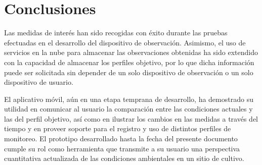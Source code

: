 \documentclass[../main]{subfiles}
\begin{document}
\section{Conclusiones}

Las medidas de interés han sido recogidas con éxito durante las pruebas
efectuadas en el desarrollo del dispositivo de observación.
Asimismo, el uso de servicios en la nube para almacenar las observaciones
obtenidas ha sido extendido con la capacidad de almacenar los perfiles
objetivo, por lo que dicha información puede ser solicitada sin depender de un
solo dispositivo de observación o un solo dispositivo de usuario.

El aplicativo móvil, aún en una etapa temprana de desarrollo, ha demostrado su
utilidad en comunicar al usuario la comparación entre las condiciones actuales
y las del perfil objetivo, así como en ilustrar los cambios en las medidas a
través del tiempo y en proveer soporte para el registro y uso de distintos
perfiles de monitoreo.
El prototipo desarrollado hasta la fecha del presente documento cumple su rol
como herramienta que transmite a su usuario una perspectiva cuantitativa
actualizada de las condiciones ambientales en un sitio de cultivo.
\end{document}
